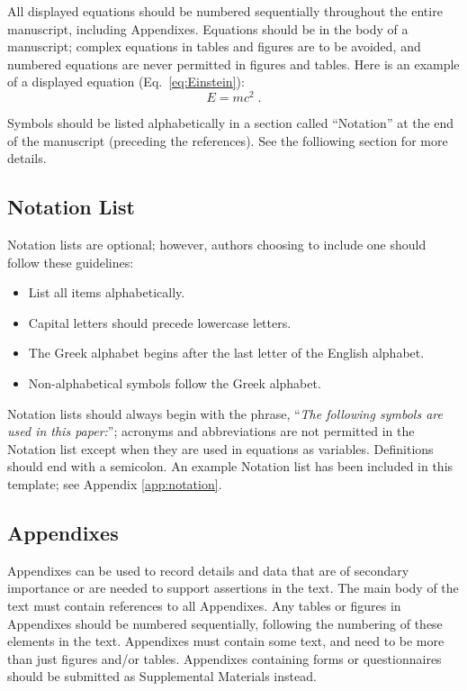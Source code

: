 \documentclass[Journal,letterpaper,NoLineNumbers]{ascelike-new}
\begin{document}
All displayed equations should be numbered sequentially throughout the entire manuscript, including Appendixes. Equations should be in the body of a manuscript; complex equations in tables and figures are to be avoided, and numbered equations are never permitted in figures and tables. Here is an example of a displayed equation (Eq.~\ref{eq:Einstein}):
\begin{equation} \label{eq:Einstein}
E = m c^{2} \;.
\end{equation}

Symbols should be listed alphabetically in a section called ``Notation'' at the end of the manuscript (preceding the references). See the folliowing section for more details.

\subsection{Notation List}

Notation lists are optional; however, authors choosing to include one should follow these guidelines:

\begin{itemize}
\item List all items alphabetically.
\item Capital letters should precede lowercase letters.
\item The Greek alphabet begins after the last letter of the English alphabet.
\item Non-alphabetical symbols follow the Greek alphabet.
\end{itemize}

Notation lists should always begin with the phrase, ``\textit{The following symbols are used in this paper:}''; acronyms and abbreviations are not permitted in the Notation list except when they are used in equations as variables. Definitions should end with a semicolon. An example Notation list has been included in this template; see Appendix \ref{app:notation}.

\subsection{Appendixes}

Appendixes can be used to record details and data that are of secondary importance or are needed to support assertions in the text. The main body of the text must contain references to all Appendixes. Any tables or figures in Appendixes should be numbered sequentially, following the numbering of these elements in the text. Appendixes must contain some text, and need to be more than just figures and/or tables. Appendixes containing forms or questionnaires should be submitted as Supplemental Materials instead.
\end{document}
